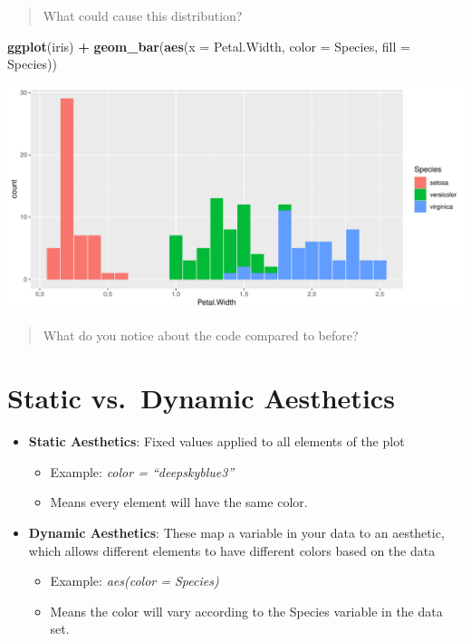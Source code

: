 \documentclass[
]{book}
\newenvironment{Shaded}{\begin{snugshade}}{\end{snugshade}}
\newcommand{\AttributeTok}[1]{\textcolor[rgb]{0.13,0.29,0.53}{#1}}
\newcommand{\FunctionTok}[1]{\textcolor[rgb]{0.13,0.29,0.53}{\textbf{#1}}}
\newcommand{\NormalTok}[1]{#1}
\newcommand{\SpecialCharTok}[1]{\textcolor[rgb]{0.81,0.36,0.00}{\textbf{#1}}}
\providecommand{\tightlist}{%
  \setlength{\itemsep}{0pt}\setlength{\parskip}{0pt}}
\begin{document}
\begin{quote}
What could cause this distribution?
\end{quote}

\begin{Shaded}
\begin{Highlighting}[]
\FunctionTok{ggplot}\NormalTok{(iris) }\SpecialCharTok{+} 
  \FunctionTok{geom\_bar}\NormalTok{(}\FunctionTok{aes}\NormalTok{(}\AttributeTok{x =}\NormalTok{ Petal.Width, }\AttributeTok{color =}\NormalTok{ Species, }\AttributeTok{fill =}\NormalTok{ Species))}
\end{Highlighting}
\end{Shaded}

\begin{flushleft}\includegraphics{_main_files/figure-html/unnamed-chunk-34-1} \end{flushleft}

\begin{quote}
What do you notice about the code compared to before?
\end{quote}

\section{Static vs.~Dynamic Aesthetics}\label{static-vs.-dynamic-aesthetics}

\begin{itemize}
\tightlist
\item
  \textbf{Static Aesthetics}: Fixed values applied to all elements of the plot

  \begin{itemize}
  \tightlist
  \item
    Example: \emph{color = ``deepskyblue3''}
  \item
    Means every element will have the same color.
  \end{itemize}
\item
  \textbf{Dynamic Aesthetics}: These map a variable in your data to an aesthetic, which allows different elements to have different colors based on the data

  \begin{itemize}
  \tightlist
  \item
    Example: \emph{aes(color = Species)}
  \item
    Means the color will vary according to the Species variable in the data set.
  \end{itemize}
\end{itemize}
\end{document}
